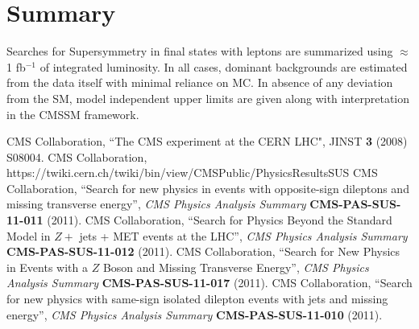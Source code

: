 \documentclass{PoS}
\begin{document}
\section{Summary}
Searches for Supersymmetry in final states with leptons are summarized using $\approx$ 1 fb$^{-1}$ of integrated luminosity. In all cases, dominant backgrounds 
are estimated from the data itself with minimal reliance on MC. In absence of any deviation from the SM, model independent upper limits are given 
along with interpretation in the CMSSM framework.
\begin{thebibliography}{99}
CMS Collaboration, ``The CMS experiment at the CERN LHC", JINST {\bf 3} (2008) S08004.
CMS Collaboration, https://twiki.cern.ch/twiki/bin/view/CMSPublic/PhysicsResultsSUS
CMS Collaboration, ``Search for new physics in events with opposite-sign dileptons and missing transverse energy'', {\it CMS Physics Analysis Summary} {\bf CMS-PAS-SUS-11-011} (2011).
CMS Collaboration, ``Search for Physics Beyond the Standard Model in $Z +$ jets + MET events at the LHC'', {\it CMS Physics Analysis Summary} {\bf CMS-PAS-SUS-11-012} (2011).
CMS Collaboration, ``Search for New Physics in Events with a $Z$ Boson and Missing Transverse Energy'', {\it CMS Physics Analysis Summary} {\bf CMS-PAS-SUS-11-017} (2011).
CMS Collaboration, ``Search for new physics with same-sign isolated dilepton events with jets and missing energy'', {\it CMS Physics Analysis Summary} {\bf CMS-PAS-SUS-11-010} (2011).
\end{thebibliography}
\end{document}
